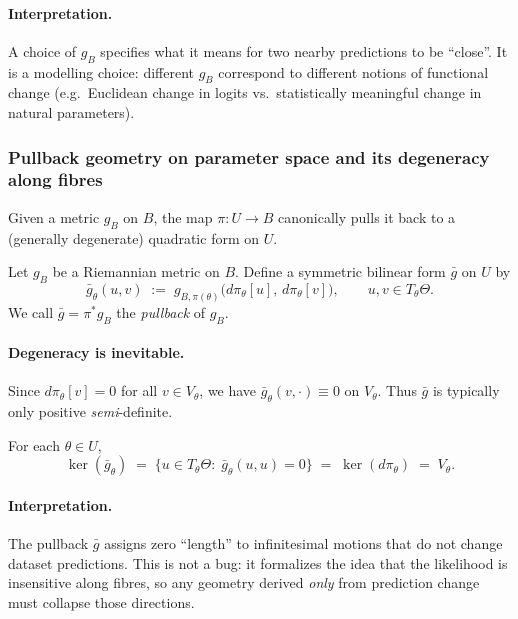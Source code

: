 \paragraph{Interpretation.}
A choice of $g_B$ specifies what it means for two nearby predictions to be ``close''.
It is a modelling choice: different $g_B$ correspond to different notions of functional change
(e.g.\ Euclidean change in logits vs.\ statistically meaningful change in natural parameters).

\subsubsection{Pullback geometry on parameter space and its degeneracy along fibres}

Given a metric $g_B$ on $B$, the map $\pi:U\to B$ canonically pulls it back to a (generally
degenerate) quadratic form on $U$.

\begin{gdefn}
\label{def:pullback_semimetric}
Let $g_B$ be a Riemannian metric on $B$.
Define a symmetric bilinear form $\bar g$ on $U$ by
\[
\bar g_\theta(u,v)
\;:=\;
g_{B,\pi(\theta)}\!\bigl(d\pi_\theta[u],\,d\pi_\theta[v]\bigr),
\qquad
u,v\in T_\theta\Theta.
\]
We call $\bar g=\pi^\ast g_B$ the \emph{pullback} of $g_B$.
\end{gdefn}

\paragraph{Degeneracy is inevitable.}
Since $d\pi_\theta[v]=0$ for all $v\in V_\theta$, we have $\bar g_\theta(v,\cdot)\equiv 0$ on $V_\theta$.
Thus $\bar g$ is typically only positive \emph{semi}-definite.

\begin{gprop}
\label{prop:pullback_kernel_vertical}
For each $\theta\in U$,
\[
\ker(\bar g_\theta)
\;=\;
\{u\in T_\theta\Theta:\;\bar g_\theta(u,u)=0\}
\;=\;
\ker(d\pi_\theta)
\;=\;
V_\theta.
\]
\end{gprop}

\paragraph{Interpretation.}
The pullback $\bar g$ assigns zero ``length'' to infinitesimal motions that do not change
dataset predictions.  This is not a bug: it formalizes the idea that the likelihood is insensitive
along fibres, so any geometry derived \emph{only} from prediction change must collapse those directions.

